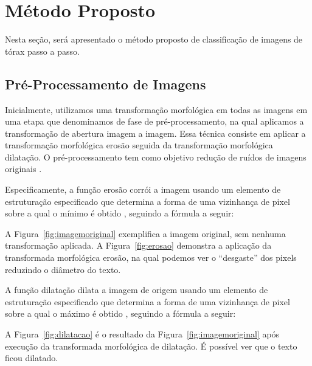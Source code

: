 \documentclass[
12pt,        %
oneside,     %
a4paper,     %
english,       %
brazil        %
%
%
]{ppgca}
\begin{document}
\section{Método Proposto}
Nesta seção, será apresentado o método proposto de classificação de imagens de tórax passo a passo.

\subsection{Pré-Processamento de Imagens}
Inicialmente, utilizamos uma transformação morfológica em todas as imagens em uma etapa que denominamos de fase de pré-processamento, na qual aplicamos a transformação de abertura imagem a imagem. Essa técnica consiste em aplicar a transformação morfológica erosão seguida da transformação morfológica dilatação. O pré-processamento tem como objetivo redução de ruídos de imagens originais \cite{haralick1992,vernon1991}.

Especificamente, a função erosão corrói a imagem usando um elemento de estruturação especificado que determina a forma de uma vizinhança de pixel sobre a qual o mínimo é obtido \cite{gonzalez1992,haralick1992}, seguindo a fórmula a seguir:

\begin{center}
\end{center}

A Figura~\ref{fig:imagemoriginal} exemplifica a imagem original, sem nenhuma transformação aplicada. A Figura~\ref{fig:erosao} demonstra a aplicação da transformada morfológica erosão, na qual podemos ver o “desgaste” dos pixels reduzindo o diâmetro do texto.

A função dilatação dilata a imagem de origem usando um elemento de estruturação especificado que determina a forma de uma vizinhança de pixel sobre a qual o máximo é obtido \cite{gonzalez1992,haralick1992}, seguindo a fórmula a seguir:

\begin{center}
\end{center}

A Figura~\ref{fig:dilatacao} é o resultado da Figura~\ref{fig:imagemoriginal} após execução da transformada morfológica de dilatação. É possível ver que o texto ficou dilatado. \cite{gonzalez1992,haralick1992}
\end{document}
